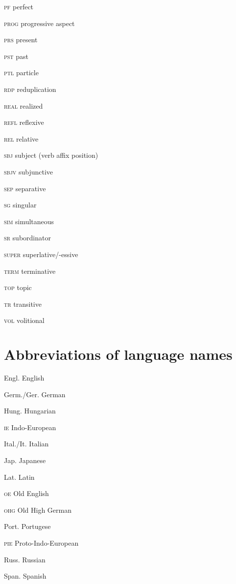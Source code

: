 \begin{refsection}
\begin{multicols}{2}
	\textsc{pf}  perfect
	
	\textsc{prog}  progressive aspect
	
	\textsc{prs}  present
	
	\textsc{pst}  past
	
	\textsc{ptl}  particle
	
	\textsc{rdp}  reduplication
	
	\textsc{real}  realized
	
	\textsc{refl}  reflexive
	
	\textsc{rel}  relative
	
	\textsc{sbj}  subject (verb affix position)
	
	\textsc{sbjv}  subjunctive
	
	\textsc{sep}  separative
	
	\textsc{sg}  singular
	
	\textsc{sim}  simultaneous
	
	\textsc{sr}  subordinator
	
	\textsc{super}  superlative/-essive
	
	\textsc{term}  terminative
	
	\textsc{top}  topic
	
	\textsc{tr}  transitive
	
	\textsc{vol}  volitional
\end{multicols}

\section*{Abbreviations of language names}

\begin{multicols}{2}\setlength{\parindent}{0pt}
	
	
	Engl.	English
	
	Germ./Ger.	German
	
	Hung.	Hungarian
	
	\textsc{ie} Indo-European
	
	Ital./It.	Italian
	
	Jap.	Japanese
	
	Lat.	Latin
	
	\textsc{oe} Old English
	
	\textsc{ohg} Old High German
		
	Port.	Portugese
	
	\textsc{pie} Proto-Indo-European 
	
	Russ.	Russian

	Span.	Spanish	
	

\end{multicols}
\end{refsection}
